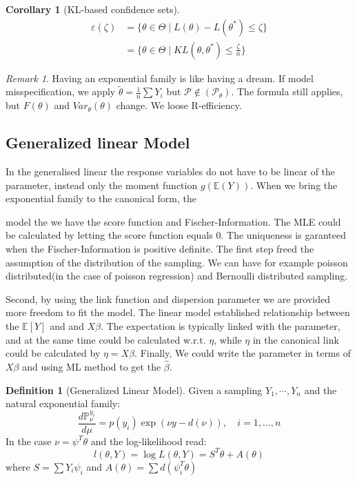 \documentclass[a4paper,12pt, oneside, fleqn]{book}
\newtheorem{corollary}{Corollary}[theorem]
\theoremstyle{definition}
\newtheorem{definition}{Definition}[section]
\theoremstyle{remark}
\newtheorem*{remark}{Remark}
\begin{document}
\begin{corollary}[KL-based confidence sets]
	\begin{align*}
		\varepsilon(\zeta) &= \{ \theta \in \Theta \mid L(\theta) - L(\theta^*) \leq \zeta \}\\
		&= \{\theta \in \Theta \mid KL(\theta, \theta^*) \leq \frac{\zeta}{n} \}
	\end{align*}
\end{corollary}


\begin{remark}
Having an exponential family is like having a dream.
If model misspecification, we apply $\tilde{\theta} = \frac{1}{n} \sum Y_i$ but $\mathcal{P} \notin (\mathcal{P}_\theta)$. The formula still applies, but $F(\theta)$ and $Var_\theta(\theta)$ change. We loose R-efficiency.	
\end{remark}

\subsection{Generalized linear Model}
In the generalised linear the response variables do not have to be linear of the parameter, instead only the moment function $g(\mathbb{E}(Y))$. When we bring the exponential family to the canonical form, the 

 model the we have the score function and Fischer-Information. The MLE could be calculated by letting the score function equals 0. The uniqueness is garanteed when the Fischer-Information is positive definite. The first step freed the assumption of the distribution of the sampling. We can have for example poisson distributed(in the case of poisson regression) and Bernoulli distributed sampling.\par 
Second, by using the link function and dispersion parameter we are provided more freedom to fit the model. The linear model established relationship between the $\mathbb{E}[Y]$ and and $X\beta$. The expectation is typically linked with the parameter, and at the same time could be calculated w.r.t. $\eta$, while $\eta$ in the canonical link could be calculated by $\eta = X\beta$. Finally, We could write the parameter in terms of $X\beta$ and using ML method to get the $\hat{\beta}$.  
\begin{definition}[Generalized Linear Model]
Given a sampling $Y_1, \cdots, Y_n$ and the natural exponential family:
\begin{equation}
    \frac{d\mathbb{P}_\nu^{y_{i}}}{d\mu} = p(y_i)\exp(\nu y - d(\nu)), \quad i = 1, \dots, n
\end{equation}
In the case $\nu = \psi^T \theta$
and the log-likelihood read:
\begin{equation}
    l(\theta, Y) = \log L (\theta, Y) = S^T \theta + A(\theta)
\end{equation}
where $S = \sum Y_i \psi_i$ and $A(\theta) = \sum d(\psi_i^T \theta)$
\end{definition}
\end{document}
